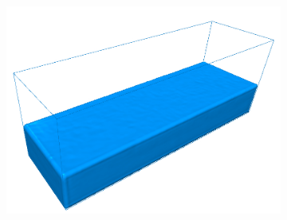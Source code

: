 \begin{figure}[h!]
\begin{subfigure}[t]{.3\textwidth}
        	\includegraphics[scale=0.65]{obrazky-figures/app/Blocks05.jpg}
	\end{subfigure}%
	\label{fig:2blocks}
\end{figure}


